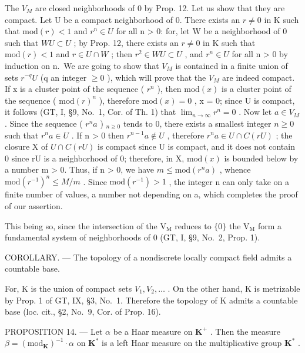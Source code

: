 The \(V_{M}\) are closed neighborhoods of 0 by Prop. 12. Let us show that they are compact. Let U be a compact neighborhood of 0. There exists an \(r \neq 0\) in K such that \(\text{mod}(r) < 1\) and \(r^{n} \in U\) for all n \textgreater{} 0: for, let W be a neighborhood of 0 such that \(WU \subset U\) ; by Prop. 12, there exists an \(r \neq 0\) in K such that \(\text{mod}(r) < 1\) and \(r \in U \cap W\) ; then \(r^{2} \in WU \subset U\) , and \(r^{n} \in U\) for all n \textgreater{} 0 by induction on n.~We are going to show that \(V_{M}\) is contained in a finite union of sets \(r^{-q}U\) (q an integer \(\geqslant 0\) ), which will prove that the \(V_{M}\) are indeed compact. If x is a cluster point of the sequence ( \(r^{n}\) ), then \(\text{mod}(x)\) is a cluster point of the sequence ( \(\text{mod}(r)^{n}\) ), therefore \(\text{mod}(x) = 0\) , x = 0; since U is compact, it follows (GT, I, §9, No.~1, Cor. of Th. 1) that \(\lim_{n \to \infty} r^{n} = 0\) . Now let \(a \in V_{M}\) . Since the sequence ( \(r^{n}a\) ) \(_{n \geqslant 0}\) tends to 0, there exists a smallest integer \(n \geqslant 0\) such that \(r^{n}a \in U\) . If n \textgreater{} 0 then \(r^{n-1}a \notin U\) , therefore \(r^{n}a \in U \cap C(rU)\) ; the closure X of \(U \cap C(rU)\) is compact since U is compact, and it does not contain 0 since rU is a neighborhood of 0; therefore, in X, \(\text{mod}(x)\) is bounded below by a number m \textgreater{} 0. Thus, if n \textgreater{} 0, we have \(m \leqslant \text{mod}(r^{n}a)\) , whence \(\text{mod}(r^{-1})^{n} \leqslant M/m\) . Since \(\text{mod}(r^{-1}) > 1\) , the integer n can only take on a finite number of values, a number not depending on a, which completes the proof of our assertion.

This being so, since the intersection of the \(\mathrm{V_M}\) reduces to \(\{0\}\) the \(\mathrm{V_M}\) form a fundamental system of neighborhoods of 0 (GT, I, §9, No.~2, Prop. 1).

COROLLARY. --- The topology of a nondiscrete locally compact field admits a countable base.

For, K is the union of compact sets \(V_{1}, V_{2}, \ldots\) . On the other hand, K is metrizable by Prop. 1 of GT, IX, §3, No.~1. Therefore the topology of K admits a countable base (loc. cit., §2, No.~9, Cor. of Prop. 16).

PROPOSITION 14. --- Let \(\alpha\) be a Haar measure on \(\mathbf{K}^{+}\) . Then the measure \(\beta = (\mathrm{mod}_{\mathbf{K}})^{-1} \cdot \alpha\) on \(\mathbf{K}^{*}\) is a left Haar measure on the multiplicative group \(\mathbf{K}^{*}\) .

